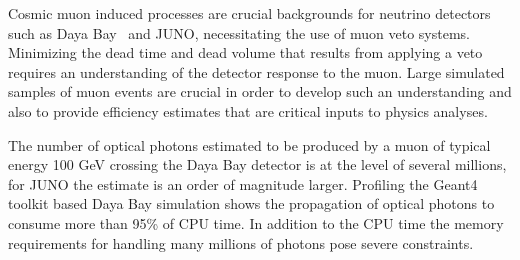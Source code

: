 \documentclass[a4paper]{jpconf}
\begin{document}

Cosmic muon induced processes are crucial backgrounds for neutrino
detectors such as Daya Bay~\cite{dyb} and JUNO\cite{juno}, 
necessitating the use of muon veto systems.
Minimizing the dead time and dead volume that results from applying 
a veto requires an understanding of the detector response to the muon.
Large simulated samples of muon events are crucial in order to 
develop such an understanding and also to provide efficiency estimates 
that are critical inputs to physics analyses.

The number of optical photons estimated to be produced by a muon of 
typical energy 100 GeV crossing the Daya Bay detector is at the level of several millions, 
for JUNO the estimate is an order of magnitude larger. 
Profiling the Geant4 toolkit based Daya Bay simulation 
shows the propagation of optical photons to consume more than 95\% of CPU time. 
In addition to the CPU time the memory requirements for handling many millions 
of photons pose severe constraints.  

%
%
\end{document}
